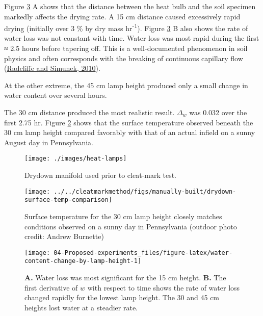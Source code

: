 \documentclass[
  letterpaper,
  openany]{book}
\begin{document}
Figure \ref{fig:water-content-change-by-lamp-height} A shows that the distance between the heat bulb and the soil specimen markedly affects the drying rate.
A 15 cm distance caused excessively rapid drying (initially over 3 \% by dry mass hr\textsuperscript{-1}).
Figure \ref{fig:water-content-change-by-lamp-height} B also shows the rate of water loss was not constant with time.
Water loss was most rapid during the first ≈ 2.5 hours before tapering off.
This is a well-documented phenomenon in soil physics and often corresponds with the breaking of continuous capillary flow (\protect\hyperlink{ref-Radcliffe2010}{Radcliffe and Simunek, 2010}).

At the other extreme, the 45 cm lamp height produced only a small change in water content over several hours.

The 30 cm distance produced the most realistic result.
\(\Delta_w\) was 0.032 over the first 2.75 hr.
Figure \ref{fig:lamp-height-calibration} shows that the surface temperature observed beneath the 30 cm lamp height compared favorably with that of an actual infield on a sunny August day in Pennsylvania.

\begin{figure}

{\centering \texttt{[image: ./images/heat-lamps]} 

}

\caption{Drydown manifold used prior to cleat-mark test.}\label{fig:heat-lamps-photo}
\end{figure}

\begin{figure}

{\centering \texttt{[image: ../../cleatmarkmethod/figs/manually-built/drydown-surface-temp-comparison]} 

}

\caption[Temperature beneath drydown apparatus c.f. outdoor conditions]{Surface temperature for the 30 cm lamp height closely matches conditions observed on a sunny day in Pennsylvania (outdoor photo credit: Andrew Burnette)}\label{fig:lamp-height-calibration}
\end{figure}

\begin{figure}

{\centering \texttt{[image: 04-Proposed-experiments\_files/figure-latex/water-content-change-by-lamp-height-1]} 

}

\caption[Changes in total $w$ and evaporation rate with time]{\textbf{A.} Water loss was most significant for the 15 cm height. \textbf{B.} The first derivative of $w$ with respect to time shows the rate of water loss changed rapidly for the lowest lamp height. The 30 and 45 cm heights lost water at a steadier rate.}\label{fig:water-content-change-by-lamp-height}
\end{figure}
\end{document}
